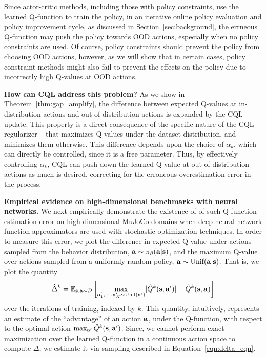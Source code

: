 Since actor-critic methods, including those with policy constraints, use the learned Q-function to train the policy, in an iterative online policy evaluation and policy improvement cycle, as discussed in Section~\ref{sec:background}, the errneous Q-function may push the policy towards OOD actions, especially when no policy constraints are used. Of course, policy constraints should prevent the policy from choosing OOD actions, however, as we will show that in certain cases, policy constraint methods might also fail to prevent the effects on the policy due to incorrectly high Q-values at OOD actions. 



\textbf{How can CQL address this problem?} As we show in Theorem~\ref{thm:gap_amplify}, the difference between expected Q-values at in-distribution actions and out-of-distribution actions is expanded by the CQL update. This property is a direct consequence of the specific nature of the CQL regularizer -- that maximizes Q-values under the dataset distribution, and minimizes them otherwise. This difference depends upon the choice of $\alpha_k$, which can directly be controlled, since it is a free parameter. Thus, by effectively controlling $\alpha_k$, CQL can push down the learned Q-value at out-of-distribution actions as much is desired, correcting for the erroneous overestimation error in the process.  








\textbf{Empirical evidence on high-dimensional benchmarks with neural networks.}  
We next empirically demonstrate the existence of of such Q-function estimation error on high-dimensional MuJoCo domains when deep neural network function approximators are used with stochastic optimization techniques. In order to measure this error, we plot the difference in expected Q-value under actions sampled from the behavior distribution, $\mathbf{a} \sim {\pi_\beta}(\mathbf{a}|\mathbf{s})$, and the maximum Q-value over actions sampled from a uniformly random policy, $\mathbf{a} \sim \text{Unif}(\mathbf{a}|\mathbf{s})$. That is, we plot the quantity
\begin{equation}
\label{eqn:delta_eqn}
    \hat{\Delta}^k = \mathbb{E}_{\mathbf{s}, \mathbf{a} \sim \mathcal{D}}\left[\max_{\mathbf{a}'_1, \cdots, \mathbf{a}'_N \sim \text{Unif}(\mathbf{a}')}[\hat{Q}^k(\mathbf{s}, \mathbf{a}')]- \hat{Q}^k(\mathbf{s}, \mathbf{a})\right]
\end{equation}
over the iterations of training, indexed by $k$. This quantity, intuitively, represents an estimate of the ``advantage'' of an action $\mathbf{a}$, under the Q-function, with respect to the optimal action $\max_{\mathbf{a}'} \hat{Q}^k(\mathbf{s}, \mathbf{a}')$. Since, we cannot perform exact maximization over the learned Q-function in a continuous action space to compute $\Delta$, we estimate it via sampling described in Equation~\ref{eqn:delta_eqn}.

